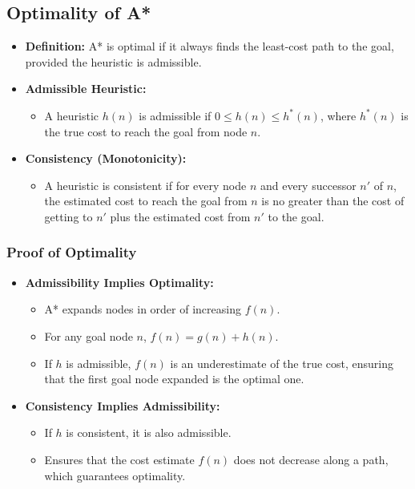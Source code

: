 \documentclass[8pt]{article}
\begin{document}
\subsection{Optimality of A*}
\begin{itemize}
    \item \textbf{Definition:} A* is optimal if it always finds the least-cost path to the goal, provided the heuristic is admissible.
    \item \textbf{Admissible Heuristic:} 
    \begin{itemize}
        \item A heuristic \( h(n) \) is admissible if \( 0 \leq h(n) \leq h^*(n) \), where \( h^*(n) \) is the true cost to reach the goal from node \( n \).
    \end{itemize}
    \item \textbf{Consistency (Monotonicity):} 
    \begin{itemize}
        \item A heuristic is consistent if for every node \( n \) and every successor \( n' \) of \( n \), the estimated cost to reach the goal from \( n \) is no greater than the cost of getting to \( n' \) plus the estimated cost from \( n' \) to the goal.
    \end{itemize}
\end{itemize}

\subsubsection*{Proof of Optimality}
\begin{itemize}
    \item \textbf{Admissibility Implies Optimality:}
    \begin{itemize}
        \item A* expands nodes in order of increasing \( f(n) \).
        \item For any goal node \( n \), \( f(n) = g(n) + h(n) \).
        \item If \( h \) is admissible, \( f(n) \) is an underestimate of the true cost, ensuring that the first goal node expanded is the optimal one.
    \end{itemize}
    \item \textbf{Consistency Implies Admissibility:}
    \begin{itemize}
        \item If \( h \) is consistent, it is also admissible.
        \item Ensures that the cost estimate \( f(n) \) does not decrease along a path, which guarantees optimality.
    \end{itemize}
\end{itemize}
\end{document}
